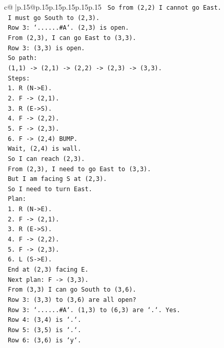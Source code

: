 \documentclass{article}
\begin{document}
{\begin{supertabular}{c@{$\;$}|p{.15\linewidth}@{}p{.15\linewidth}p{.15\linewidth}p{.15\linewidth}p{.15\linewidth}p{.15\linewidth}}
{{{\texttt{   So from (2,2) I cannot go East.} \\
\texttt{   I must go South to (2,3).} \\
\texttt{   Row 3: `......\#A`. (2,3) is open.} \\
\texttt{   From (2,3), I can go East to (3,3).} \\
\texttt{   Row 3: (3,3) is open.} \\
\texttt{   So path:} \\
\texttt{   (1,1) {-}> (2,1) {-}> (2,2) {-}> (2,3) {-}> (3,3).} \\
\texttt{   Steps:} \\
\texttt{   1. R (N{-}>E).} \\
\texttt{   2. F {-}> (2,1).} \\
\texttt{   3. R (E{-}>S).} \\
\texttt{   4. F {-}> (2,2).} \\
\texttt{   5. F {-}> (2,3).} \\
\texttt{   6. F {-}> (2,4) BUMP.} \\
\texttt{   Wait, (2,4) is wall.} \\
\texttt{   So I can reach (2,3).} \\
\texttt{   From (2,3), I need to go East to (3,3).} \\
\texttt{   But I am facing S at (2,3).} \\
\texttt{   So I need to turn East.} \\
\texttt{   Plan:} \\
\texttt{   1. R (N{-}>E).} \\
\texttt{   2. F {-}> (2,1).} \\
\texttt{   3. R (E{-}>S).} \\
\texttt{   4. F {-}> (2,2).} \\
\texttt{   5. F {-}> (2,3).} \\
\texttt{   6. L (S{-}>E).} \\
\texttt{   End at (2,3) facing E.} \\
\texttt{   Next plan: F {-}> (3,3).} \\
\texttt{   From (3,3) I can go South to (3,6).} \\
\texttt{   Row 3: (3,3) to (3,6) are all open?} \\
\texttt{   Row 3: `......\#A`. (1,3) to (6,3) are `.`. Yes.} \\
\texttt{   Row 4: (3,4) is `.`.} \\
\texttt{   Row 5: (3,5) is `.`.} \\
\texttt{   Row 6: (3,6) is `y`.} \\
}}}
\end{supertabular}}
\end{document}
